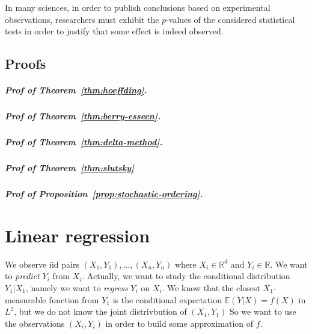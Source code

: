 \documentclass[
	fontsize=11pt, %
	twoside=false, %
	numbers=noenddot, %
]{kaobook}
\newcommand{\E}{\mathbb E}
\newcommand{\R}{\mathbb R}
\begin{document}
In many sciences, in order to publish conclusions based on experimental observations, researchers must exhibit the $p$-values of the considered statistical tests in order to justify that some effect is indeed observed.


\section{Proofs} %
\label{sec:chap03-proofs}


\paragraph{Prof of Theorem~\ref{thm:hoeffding}.} 

\paragraph{Prof of Theorem~\ref{thm:berry-esseen}.} 

\paragraph{Prof of Theorem~\ref{thm:delta-method}.} 

\paragraph{Prof of Theorem~\ref{thm:slutsky}} 

\paragraph{Prof of Proposition~\ref{prop:stochastic-ordering}.} 



% 


\setchapterpreamble[u]{\margintoc}
\chapter{Linear regression}
\label{chap:linear_regression}

We observe iid pairs $(X_1, Y_1), \ldots, (X_n, Y_n)$ where $X_i \in \R^d$ and $Y_i \in \R$.
We want to \emph{predict} $Y_i$ from $X_i$.
Actually, we want to study the conditional distribution $Y_1 | X_1$, namely we want to \emph{regress} $Y_i$ on $X_i$.
We know that the closest $X_1$-measurable function from $Y_1$ is the conditional expectation $\E (Y | X) = f(X)$  in $L^2$, but we do not know the joint distrivbution of $(X_1, Y_1)$
So we want to use the observations $(X_i, Y_i)$ in order to build some approximation of $f$.
\end{document}
